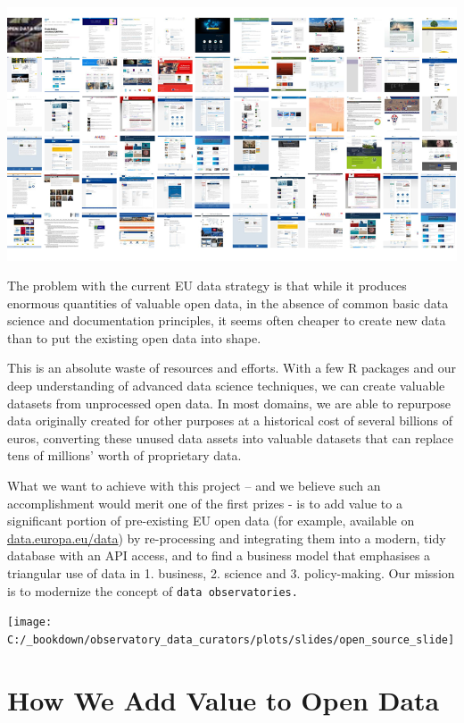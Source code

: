 \documentclass[
  a4paper,
  openany, a4paper, oneside]{book}
\begin{document}
\begin{center}\includegraphics[width=11.11in]{plots/screenshots/observatory_collage_16x9_800} \end{center}

The problem with the current EU data strategy is that while it produces enormous quantities of valuable open data, in the absence of common basic data science and documentation principles, it seems often cheaper to create new data than to put the existing open data into shape.

This is an absolute waste of resources and efforts. With a few R packages and our deep understanding of advanced data science techniques, we can create valuable datasets from unprocessed open data. In most domains, we are able to repurpose data originally created for other purposes at a historical cost of several billions of euros, converting these unused data assets into valuable datasets that can replace tens of millions' worth of proprietary data.

What we want to achieve with this project -- and we believe such an accomplishment would merit one of the first prizes - is to add value to a significant portion of pre-existing EU open data (for example, available on \href{https://data.europa.eu/data/}{data.europa.eu/data}) by re-processing and integrating them into a modern, tidy database with an API access, and to find a business model that emphasises a triangular use of data in 1. business, 2. science and 3. policy-making. Our mission is to modernize the concept of \texttt{data\ observatories.}

\begin{center}\texttt{[image: C:/\_bookdown/observatory\_data\_curators/plots/slides/open\_source\_slide]} \end{center}

\hypertarget{add-value-open-data}{%
\section{How We Add Value to Open Data}\label{add-value-open-data}}
\end{document}
